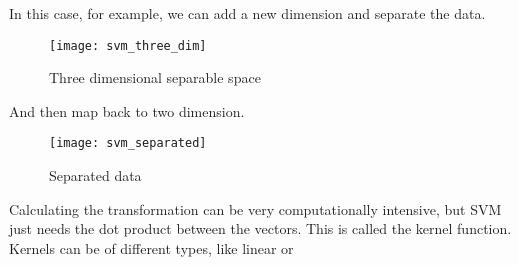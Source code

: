 In this case, for example, we can add a new dimension and separate the data. 
\begin{figure}[H]
	\centering
	\texttt{[image: svm\_three\_dim]}
	\caption{Three dimensional separable space \cite{svm_monkeylearn}}
\end{figure} 

And then map back to two dimension.
\begin{figure}[H]
	\centering
	\texttt{[image: svm\_separated]}
	\caption{Separated data \cite{svm_monkeylearn}}
\end{figure}



Calculating the transformation can be very computationally intensive, but SVM just needs the dot product between the vectors. This is called the kernel function. Kernels can be of different types, like linear or 
